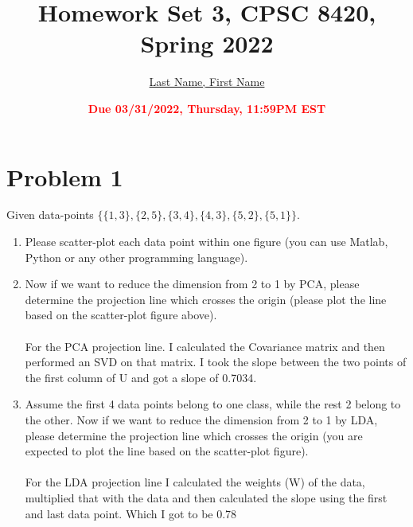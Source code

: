 \documentclass[11pt]{article}
\title{{\bf Homework Set 3, CPSC 8420, Spring 2022}} %
\author{\Large\underline{Last Name, First Name}}
\date{\textbf{\Large\textcolor{red}{Due 03/31/2022, Thursday, 11:59PM EST}}} %
\begin{document}
\maketitle

\section*{Problem 1}
Given data-points $\{\{1,3\},\{2,5\},\{3,4\},\{4,3\},\{5,2\},\{5,1\}\}$.
\begin{enumerate}
	\item Please scatter-plot each data point within one figure (you can use Matlab, Python or any other programming language). 
	\item Now if we want to reduce the dimension from 2 to 1 by PCA, please determine the projection line which crosses the origin (please plot the line based on the scatter-plot figure above).\\\\
	For the PCA projection line. I calculated the Covariance matrix and then performed an SVD on that matrix. I took the slope between the two points of the first column of U and got a slope of 0.7034. 
	\item Assume the first 4 data points belong to one class, while the rest 2 belong to the other. Now if we want to reduce the dimension from 2 to 1 by LDA, please determine the projection line which crosses the origin (you are expected to plot the line based on the scatter-plot figure).\\\\
	For the LDA projection line I calculated the weights (W) of the data, multiplied that with the data and then calculated the slope using the first and last data point. Which I got to be 0.78
\end{enumerate}
\end{document}

